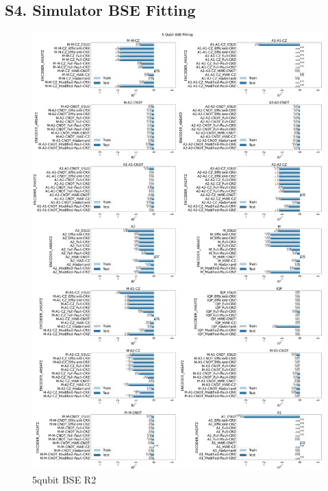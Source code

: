 \documentclass[journal=jacsat,manuscript=article]{achemso}
\begin{document}
\newpage
\subsection*{S4. Simulator BSE Fitting}\label{SI_subsection:simulator_BSE_Fitting}

\begin{figure}[H]
	\centering
	\includegraphics[width=0.8\linewidth]{images/5qubit_BSE_R2.png}
	\caption{5qubit BSE R2}
	\label{fig:5qubit_BSE_R2}
\end{figure}
\end{document}
